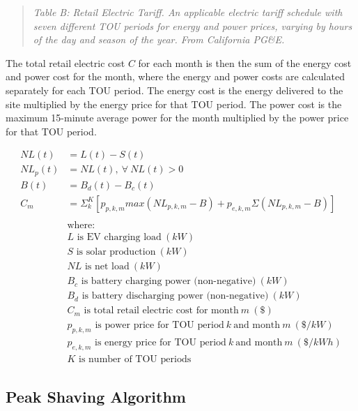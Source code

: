 \documentclass[
]{article}
\begin{document}
\begin{quote}
\emph{Table B: Retail Electric Tariff. An applicable electric tariff
schedule with seven different TOU periods for energy and power prices,
varying by hours of the day and season of the year. From California
PG\&E.}
\end{quote}

The total retail electric cost \(C\) for each month is then the sum of
the energy cost and power cost for the month, where the energy and power
costs are calculated separately for each TOU period. The energy cost is
the energy delivered to the site multiplied by the energy price for that
TOU period. The power cost is the maximum 15-minute average power for
the month multiplied by the power price for that TOU period.

\begin{equation}
\begin{split}
NL(t) &= L(t) - S(t) \\
NL_{p}(t) &= NL(t),\ \forall \ NL(t)>0 \\
B(t) &= B_d(t) - B_c(t) \\
C_m &= \Sigma_k^K [ p_{p,k,m} max(NL_{p,k,m}-B) + p_{e,k,m} \Sigma (NL_{p,k,m}-B) ] \\
\\
& \text{where:} \\
&L \text{ is EV charging load}\ (kW) \\
&S \text{ is solar production}\ (kW)\\
&NL \text{ is net load}\ (kW) \\
&B_c \text{ is battery charging power (non-negative)}\ (kW) \\
&B_d \text{ is battery discharging power (non-negative)}\ (kW) \\
&C_m \text{ is total retail electric cost for month}\ m\ (\$) \\
&p_{p,k,m} \text{ is power price for TOU period}\ k\ \text{and month}\ m\  (\$/kW) \\
&p_{e,k,m} \text{ is energy price for TOU period}\ k\ \text{and month}\ m\ (\$/kWh) \\
&K \text{ is number of TOU periods}
\end{split}
\end{equation}

\hypertarget{peak-shaving-algorithm}{%
\subsection{Peak Shaving Algorithm}\label{peak-shaving-algorithm}}
\end{document}
